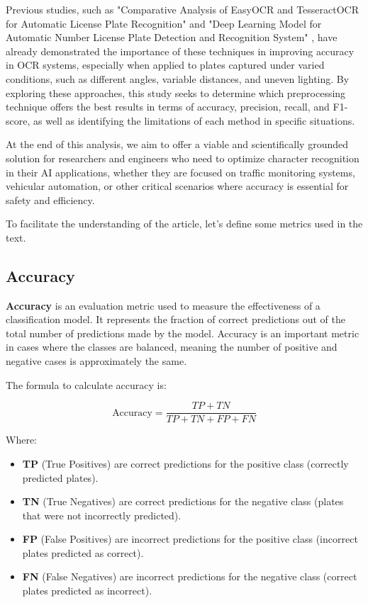 \documentclass[conference]{IEEEtran}
\begin{document}
	Previous studies, such as "Comparative Analysis of EasyOCR and TesseractOCR for Automatic License Plate Recognition" \cite{b1} and "Deep Learning Model for Automatic Number License Plate Detection and Recognition System" \cite{b2}, have already demonstrated the importance of these techniques in improving accuracy in OCR systems, especially when applied to plates captured under varied conditions, such as different angles, variable distances, and uneven lighting. By exploring these approaches, this study seeks to determine which preprocessing technique offers the best results in terms of accuracy, precision, recall, and F1-score, as well as identifying the limitations of each method in specific situations.
	
	At the end of this analysis, we aim to offer a viable and scientifically grounded solution for researchers and engineers who need to optimize character recognition in their AI applications, whether they are focused on traffic monitoring systems, vehicular automation, or other critical scenarios where accuracy is essential for safety and efficiency.
	
	To facilitate the understanding of the article, let's define some metrics used in the text.
	
	\subsection{Accuracy}
	
	\textbf{Accuracy} is an evaluation metric used to measure the effectiveness of a classification model. It represents the fraction of correct predictions out of the total number of predictions made by the model. Accuracy is an important metric in cases where the classes are balanced, meaning the number of positive and negative cases is approximately the same.
	
	The formula to calculate accuracy is:
	
	\[
	\text{Accuracy} = \frac{TP + TN}{TP + TN + FP + FN}
	\]
	
	Where:
	
	\begin{itemize}
		\item \textbf{TP} (True Positives) are correct predictions for the positive class (correctly predicted plates).
		\item \textbf{TN} (True Negatives) are correct predictions for the negative class (plates that were not incorrectly predicted).
		\item \textbf{FP} (False Positives) are incorrect predictions for the positive class (incorrect plates predicted as correct).
		\item \textbf{FN} (False Negatives) are incorrect predictions for the negative class (correct plates predicted as incorrect).
	\end{itemize}
	
\end{document}
